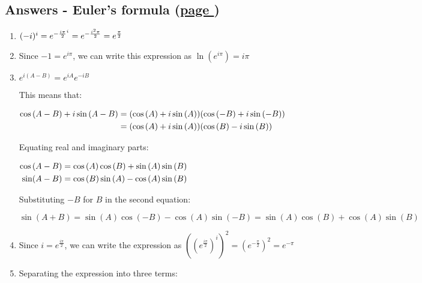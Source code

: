 \documentclass[../main.tex]{subfiles}
\begin{document}
\hypertarget{eulersformulaanswers}{\subsection*{Answers - Euler's formula (\hyperlink{eulersformulalink}{page \pageref{eulersformula}})}}

\label{Eulers answers}
\begin{spacing}{1.5}
\begin{enumerate}
    \item 
    \((-i)^i=e^{-\frac{i\pi}{2}^{i}}\\
    =e^{-\frac{i^2 \pi}{2}}\\
    =e^{\frac{\pi}{2}}\)

    \item 
    Since \(-1=e^{i \pi}\), we can write this expression as \(\ln{(e^{i \pi})}=i \pi\)

    \item 
    \(e^{i(A-B)}=e^{iA}e^{-iB}\)

    This means that:

    $
    \!
    \begin{aligned}[t]
    \cos{(A-B)+i\sin{(A-B)}}
    &=(\cos{(A)+i\sin{(A)}})(\cos{(-B)+i\sin{(-B)}})\\
    &=(\cos{(A)+i\sin{(A)}})(\cos{(B)-i\sin{(B)}})
    \end{aligned}\\
    $
    
    Equating real and imaginary parts:

    $
    \!
    \begin{aligned}[t]
    \cos{(A-B)}
    &=\cos{(A)}\cos{(B)}+\sin{(A)}\sin{(B)}\\
    \sin(A-B)
    &=\cos{(B)}\sin{(A)}-\cos{(A)}\sin{(B)}\\
    \end{aligned}\\
    $

    Substituting \(-B\) for \(B\) in the second equation:

    \(\sin{(A+B)}=\sin{(A)}\cos{(-B)}-\cos{(A)}\sin{(-B)}=\sin{(A)}\cos{(B)}+\cos{(A)}\sin{(B)}\)

    \item 
    Since \(i=e^{\frac{i \pi}{2}}\), we can write the expression as \(((e^{\frac{i \pi}{2}})^i)^2=(e^{-\frac{\pi}{2}})^2=e^{-\pi}\)

    \item 
    Separating the expression into three terms:


\end{enumerate}
\end{spacing}
\end{document}
